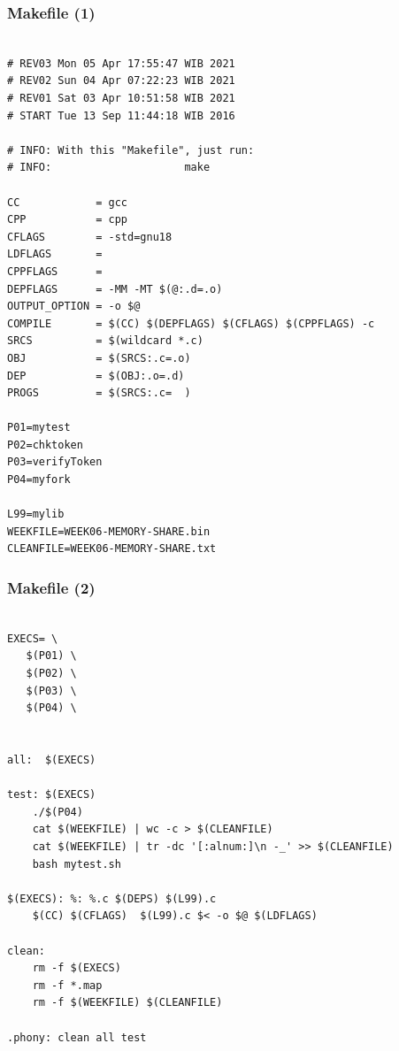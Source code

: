 \documentclass[aspectratio=169, xcolor=table, notheorems, hyperref={pdfpagelabels=false}]{beamer}
\begin{document}
\begin{frame}[fragile]
\frametitle{Makefile (1)}
\begin{lstlisting}[basicstyle=\ttfamily\tiny]         % 108

# REV03 Mon 05 Apr 17:55:47 WIB 2021
# REV02 Sun 04 Apr 07:22:23 WIB 2021
# REV01 Sat 03 Apr 10:51:58 WIB 2021
# START Tue 13 Sep 11:44:18 WIB 2016

# INFO: With this "Makefile", just run:
# INFO:                     make

CC            = gcc
CPP           = cpp
CFLAGS        = -std=gnu18
LDFLAGS       = 
CPPFLAGS      =
DEPFLAGS      = -MM -MT $(@:.d=.o) 
OUTPUT_OPTION = -o $@
COMPILE       = $(CC) $(DEPFLAGS) $(CFLAGS) $(CPPFLAGS) -c
SRCS          = $(wildcard *.c)
OBJ           = $(SRCS:.c=.o)
DEP           = $(OBJ:.o=.d)
PROGS         = $(SRCS:.c=  )

P01=mytest
P02=chktoken
P03=verifyToken
P04=myfork

L99=mylib
WEEKFILE=WEEK06-MEMORY-SHARE.bin
CLEANFILE=WEEK06-MEMORY-SHARE.txt

\end{lstlisting}
\end{frame}

\begin{frame}[fragile]
\frametitle{Makefile (2)}
\begin{lstlisting}[basicstyle=\ttfamily\tiny]         % 108

EXECS= \
   $(P01) \
   $(P02) \
   $(P03) \
   $(P04) \


all:  $(EXECS)

test: $(EXECS)
	./$(P04) 
	cat $(WEEKFILE) | wc -c > $(CLEANFILE)
	cat $(WEEKFILE) | tr -dc '[:alnum:]\n -_' >> $(CLEANFILE)
	bash mytest.sh

$(EXECS): %: %.c $(DEPS) $(L99).c
	$(CC) $(CFLAGS)  $(L99).c $< -o $@ $(LDFLAGS)

clean:
	rm -f $(EXECS)
	rm -f *.map 
	rm -f $(WEEKFILE) $(CLEANFILE)

.phony: clean all test

\end{lstlisting}
\begin{table}
\end{table}
\end{frame}

\end{document}
